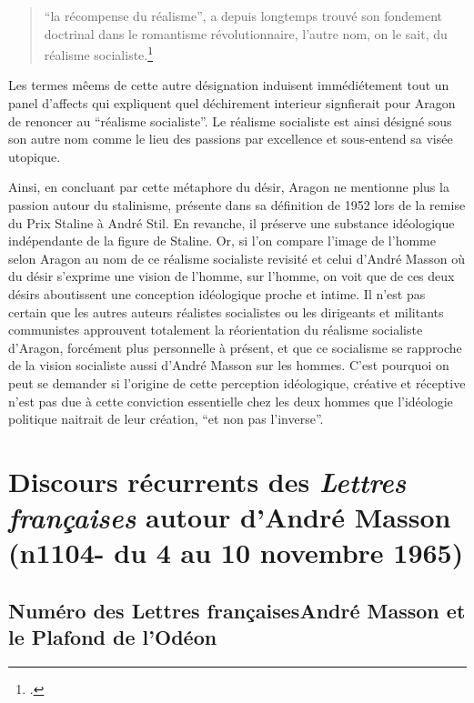 \begin{quote}
\enquote{la récompense du réalisme}, a depuis longtemps trouvé son fondement doctrinal dans le romantisme révolutionnaire, l'autre nom, on le sait, du réalisme socialiste.\footcite[p1012]{these}\end{quote}

Les termes mêems de cette autre désignation induisent immédiétement tout un panel d'affects qui expliquent quel déchirement interieur signfierait pour Aragon de renoncer au \enquote{réalisme socialiste}. Le réalisme socialiste est ainsi désigné sous son autre nom comme le lieu des passions par excellence et sous-entend sa visée utopique. 


	 Ainsi, en concluant par cette métaphore du désir, Aragon ne mentionne plus la passion autour du stalinisme, présente dans sa définition de 1952 lors de la remise du Prix Staline à André Stil. En revanche, il préserve une substance idéologique indépendante de la figure de Staline. Or, si l’on compare l’image de l’homme selon Aragon au nom de ce réalisme socialiste revisité et celui d’André Masson où du désir s’exprime une vision de l’homme, sur l’homme, on voit que de ces deux désirs aboutissent une conception idéologique proche et intime. Il n’est pas certain que les autres auteurs réalistes socialistes ou les dirigeants et militants communistes approuvent totalement la réorientation du réalisme socialiste d’Aragon, forcément plus personnelle à présent, et que ce socialisme se rapproche de la vision socialiste aussi d’André Masson sur les hommes. C’est pourquoi on peut se demander si l’origine de cette perception idéologique, créative et réceptive n’est pas due à cette conviction essentielle chez les deux hommes que l’idéologie politique naitrait de leur création, \enquote{et non pas l’inverse}. 

\section{Discours récurrents des \emph{Lettres françaises} autour d’André Masson (n1104- du 4 au 10 novembre 1965)}  

\subsection{Numéro des Lettres françaisesAndré Masson et le Plafond de l'Odéon }

